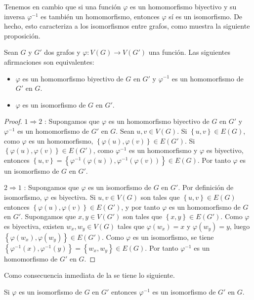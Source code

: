 Tenemos en cambio que si una función $\varphi$ es un homomorfismo biyectivo y su inversa $\varphi^{-1}$ es también un homomorfismo, entonces $\varphi$ sí es un isomorfismo. De hecho, esto caracteriza a los isomorfismos entre grafos, como muestra la siguiente proposición.
\begin{Prop}\label{Prop:Caracterizacion_isomorfismo}
   Sean $G$ y $G'$ dos grafos y $\varphi:V(G)\to V(G')$ una función. Las siguientes afirmaciones son equivalentes:
   \begin{itemize}
      \item[1.] $\varphi$ es un homomorfismo biyectivo de $G$ en $G'$ y $\varphi^{-1}$ es un homomorfismo de $G'$ en $G$.
      \item[2.] $\varphi$ es un isomorfismo de $G$ en $G'$.
   \end{itemize}
\end{Prop}
\begin{proof}
   $1\Rightarrow 2$ : Supongamos que $\varphi$ es un homomorfismo biyectivo de $G$ en $G'$ y $\varphi^{-1}$ es un homomorfismo de $G'$ en $G$. Sean $u,v \in V(G)$. Si $\left\lbrace u,v\right\rbrace\in E(G)$, como $\varphi$ es un homomorfismo, $\left\lbrace \varphi(u),\varphi(v)\right\rbrace\in E(G')$. Si $\left\lbrace \varphi(u),\varphi(v)\right\rbrace\in E(G')$, como $\varphi^{-1}$ es un homomorfismo y $\varphi$ es biyectivo, entonces $\left\lbrace u,v\right\rbrace=\left\lbrace \varphi^{-1}(\varphi(u)),\varphi^{-1}(\varphi(v))\right\rbrace\in E(G)$. Por tanto $\varphi$ es un isomorfismo de $G$ en $G'$.\par
   $2\Rightarrow 1$ : Supongamos que $\varphi$ es un isomorfismo de $G$ en $G'$. Por definición de isomorfismo, $\varphi$ es biyectiva. Si $u,v\in V(G)$ son tales que $\left\lbrace u,v\right\rbrace\in E(G)$ entonces $\left\lbrace \varphi(u),\varphi(v)\right\rbrace\in E(G')$, y por tanto $\varphi$ es un homomorfismo de $G$ en $G'$. Supongamos que $x,y\in V(G')$ son tales que $\left\lbrace x,y\right\rbrace\in E(G')$. Como $\varphi$ es biyectiva, existen $w_x,w_y\in V(G)$ tales que $\varphi(w_x)=x$ y $\varphi(w_y)=y$, luego $\left\lbrace \varphi(w_x),\varphi(w_y)\right\rbrace\in E(G')$. Como $\varphi$ es un isomorfismo, se tiene $\left\lbrace \varphi^{-1}(x),\varphi^{-1}(y)\right\rbrace=\left\lbrace w_x,w_y\right\rbrace\in E(G)$. Por tanto $\varphi^{-1}$ es un homomorfismo de $G'$ en $G$.
\end{proof}
Como consecuencia inmediata de la  se tiene lo siguiente.
\begin{Obs}\label{Cor:Inversa_isomorfismo}
   Si $\varphi$ es un isomorfismo de $G$ en $G'$ entonces $\varphi^{-1}$ es un isomorfismo de $G'$ en $G$.
\end{Obs}
